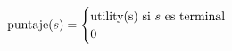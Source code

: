 \documentclass[preview]{standalone}
\begin{document}
\begin{align*}
\text{puntaje}(s) =  \begin{cases}\text{utility(s) si $s$ es terminal} \cr
                                 0 \cr
                                 \end{cases}
\end{align*}
\end{document}
